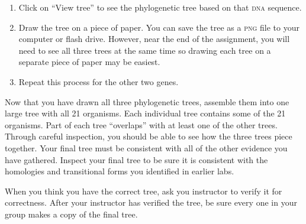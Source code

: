 \documentclass[12pt, hidelinks]{exam}
\newcommand{\dna}{\textsc{dna}}
\begin{document}
\begin{enumerate}
	\item Click on ``View tree'' to see the phylogenetic tree based on that \dna{} sequence.
	
	\item Draw the tree on a piece of paper. You can save the tree as a \textsc{png} file to your computer or flash drive. However, near the end of the assignment, you will need to see all three trees at the same time so drawing each tree on a separate piece of paper may be easiest. \label{final_step}
	
	\item Repeat this process for the other two genes.

\end{enumerate}

Now that you have drawn all three phylogenetic trees, assemble them into one large tree with all 21 organisms. Each individual tree contains some of the 21 organisms. Part of each tree ``overlaps'' with at least one of the other trees. Through careful inspection, you should be able to see how the three trees piece together. Your final tree must be consistent with all of the other evidence you have gathered. Inspect your final tree to be sure it is consistent with the homologies and transitional forms you identified in earlier labs.

When you think you have the correct tree, ask you instructor to verify it for correctness. After your instructor has verified the tree, be sure every one in your group makes a copy of the final tree.
\end{document}

